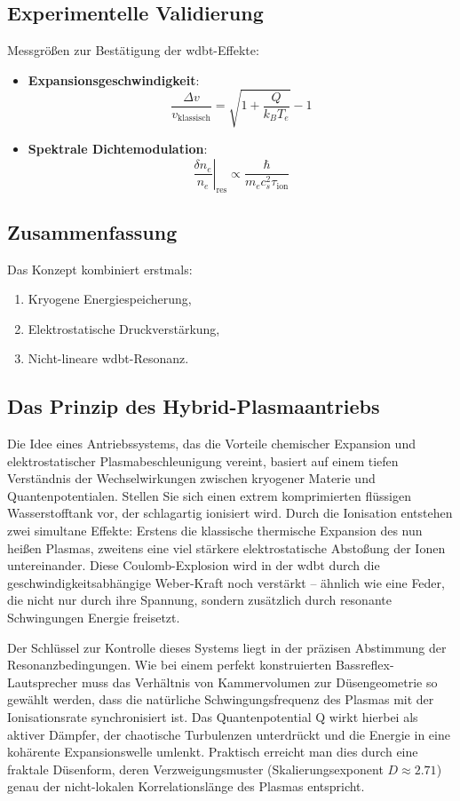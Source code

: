 \subsection{Experimentelle Validierung}
\label{subsec:experiment}

Messgrößen zur Bestätigung der \gls{wdbt}-Effekte:

\begin{itemize}
\item \textbf{Expansionsgeschwindigkeit}:
\[
\frac{\Delta v}{v_{\text{klassisch}}} = \sqrt{1 + \frac{Q}{k_B T_e}} - 1
\]

\item \textbf{Spektrale Dichtemodulation}:
\[
\left.\frac{\delta n_e}{n_e}\right|_{\text{res}} \propto \frac{\hbar}{m_e c_s^2 \tau_{\text{ion}}}
\]
\end{itemize}

\subsection*{Zusammenfassung}
Das Konzept kombiniert erstmals:
\begin{enumerate}
\item Kryogene Energiespeicherung,
\item Elektrostatische Druckverstärkung,
\item Nicht-lineare \gls{wdbt}-Resonanz.
\end{enumerate}

\subsection{Das Prinzip des Hybrid-Plasmaantriebs}
Die Idee eines Antriebssystems, das die Vorteile chemischer Expansion und elektrostatischer Plasmabeschleunigung vereint, basiert auf einem tiefen Verständnis der Wechselwirkungen zwischen kryogener
Materie und Quantenpotentialen. Stellen Sie sich einen extrem komprimierten flüssigen Wasserstofftank vor, der schlagartig ionisiert wird. Durch die Ionisation entstehen zwei simultane Effekte: Erstens
die klassische thermische Expansion des nun heißen Plasmas, zweitens eine viel stärkere elektrostatische Abstoßung der Ionen untereinander. Diese Coulomb-Explosion wird in der \gls{wdbt} durch die
geschwindigkeitsabhängige Weber-Kraft noch verstärkt – ähnlich wie eine Feder, die nicht nur durch ihre Spannung, sondern zusätzlich durch resonante Schwingungen Energie freisetzt.

Der Schlüssel zur Kontrolle dieses Systems liegt in der präzisen Abstimmung der Resonanzbedingungen. Wie bei einem perfekt konstruierten Bassreflex-Lautsprecher muss das Verhältnis von Kammervolumen
zur Düsengeometrie so gewählt werden, dass die natürliche Schwingungsfrequenz des Plasmas mit der Ionisationsrate synchronisiert ist. Das Quantenpotential Q wirkt hierbei als aktiver Dämpfer, der
chaotische Turbulenzen unterdrückt und die Energie in eine kohärente Expansionswelle umlenkt. Praktisch erreicht man dies durch eine fraktale Düsenform, deren Verzweigungsmuster
(Skalierungsexponent $D \approx 2.71$) genau der nicht-lokalen Korrelationslänge des Plasmas entspricht.

